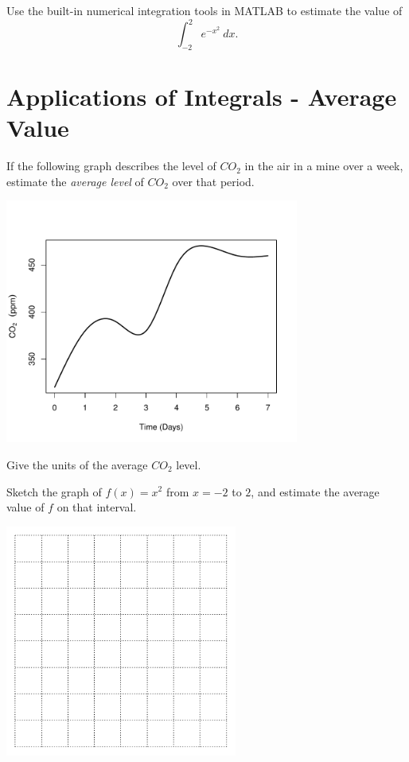 Use the built-in numerical integration tools in MATLAB to estimate the
value of
$$\int_{-2}^{2} e^{-x^2}~dx.$$
\vspace{1in}

\newpage

\section*{Applications of Integrals - Average Value}

\problem If the following graph describes the level of $CO_2$ in the
  air in a mine over a week, estimate the {\em average level} of
  $CO_2$ over that period.

\hfill \includegraphics[width=3.8in]{graphics/notes_06_graph02}

\problem Give the units of the average $CO_2$ level.

\vspace{1in}

\newpage

\problem Sketch the graph of $f(x) = x^2$ from $x=-2$ to $2$, and
  estimate the average value of $f$ on that interval.

\hfill \includegraphics[width=3in]{graphics/empty_graph_square_8}

